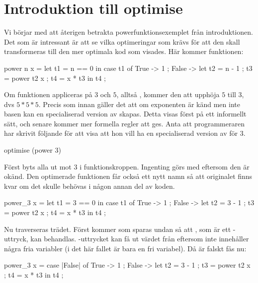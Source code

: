 \documentclass[../Optimise]{subfiles}
\begin{document}
\section{Introduktion till optimise}

Vi börjar med att återigen betrakta powerfunktionsexemplet från introduktionen. Det som är
intressant är att se vilka optimeringar som krävs för att den skall transformeras till den
mer optimala kod som visades. Här kommer funktionen:

\begin{codeEx}
power n x = let t1 = n == 0
    in case t1 of
        { True -> 1
        ; False -> let 
            { t2 = n - 1 
            ; t3 = power t2 x
            ; t4 = x * t3
            } in t4
        };
\end{codeEx}

Om funktionen appliceras på $3$ och $5$, alltså , kommer den att upphöja $5$ till $3$, dvs $5 * 5 * 5$.
Precis som innan gäller det att om exponenten är känd men inte basen kan en 
specialiserad version av  skapas. Detta visas först på ett informellt sätt, 
och senare kommer mer formella regler att ges. Anta att programmeraren
har skrivit följande för att visa att hon vill ha en specialiserad version av  för $3$.

\begin{codeEx}
optimise (power 3)
\end{codeEx}

Först byts alla  ut mot $3$ i funktionskroppen. Ingenting görs med 
 eftersom den är okänd. Den optimerade funktionen får också ett nytt namn
så att originalet finns kvar om det skulle behövas i någon annan del av koden.

\begin{codeEx}
power_3 x = let t1 = 3 == 0
    in case t1 of
        { True -> 1
        ; False -> let 
            { t2 = 3 - 1 
            ; t3 = power t2 x
            ; t4 = x * t3
            } in t4
        };
\end{codeEx}

Nu traverseras trädet. Först kommer  som 
sparas undan så att , som är ett -uttryck, kan behandlas. 
-uttrycket kan få ut värdet från  eftersom  inte innehåller några 
fria variabler (i det här fallet är bara  en fri variabel). Då  är falskt fås nu: 

\begin{codeExDiff}
power_3 x = case |False| of
    { True -> 1
    ; False -> let 
        { t2 = 3 - 1 
        ; t3 = power t2 x
        ; t4 = x * t3
        } in t4
    };
\end{codeExDiff}
\end{document}
